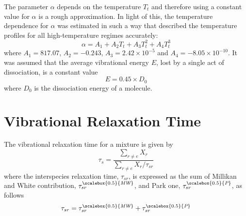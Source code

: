 \documentclass[10pt]{beamer}
\begin{document}
\begin{frame}
The parameter $\alpha$ depends on the temperature $T_t$ and therefore using a
constant value for $\alpha$ is a rough approximation. In light of this, the
temperature dependence for $\alpha$ was estimated in such a way that described
the temperature profiles for all high-temperature regimes accurately:
\begin{equation*}
\alpha=A_1+A_2T_t+A_3T_t^2+A_4T_t^3
\end{equation*}
where $A_1=817.07$, $A_2=-0.243$, $A_3=2.42\times10^{-5}$ and $A_4=-8.05\times10^{-10}$.
\newline\newline
It was assumed that the average vibrational energy $E$, lost by a single act of dissociation, is a constant value
\begin{equation*}
E=0.45\times D_0
\end{equation*}
where $D_0$ is the dissociation energy of a molecule.
\end{frame}


\section{Vibrational Relaxation Time}


\begin{frame}
The vibrational relaxation time for a mixture is given by
\begin{equation} \label{eq:tau_vt}
\tau_s=\frac{\sum\limits_{r\neq e}X_r}{\sum\limits_{r\neq e}X_r/\tau_{sr}}
\end{equation}
where the interspecies relaxation time, $\tau_{sr}$, is expressed as the sum
of Millikan and White contribution, $\tau_{sr}^{\scalebox{0.5}{\textit{MW}}}$,
and Park one, $\tau_{sr}^{\scalebox{0.5}{\textit{P}}}$, as follows
\begin{equation} \label{eq:tau_sr}
\tau_{sr}=\tau_{sr}^{\scalebox{0.5}{\textit{MW}}}+\tau_{sr}^{\scalebox{0.5}{\textit{P}}}
\end{equation}
\end{frame}
\end{document}
